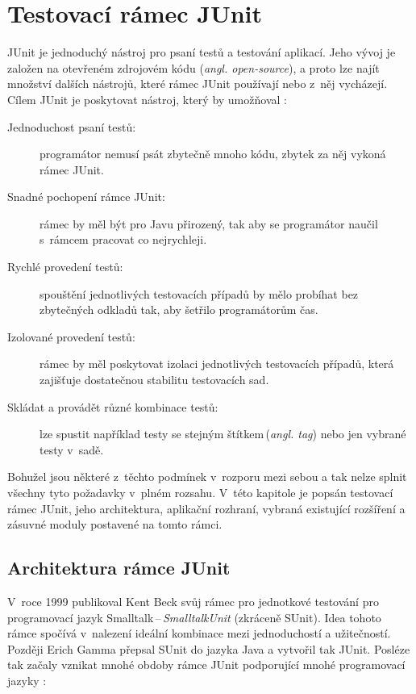 \chapter{Testovací rámec JUnit}                                           %
JUnit je jednoduchý nástroj pro psaní testů a testování aplikací. Jeho vývoj je založen na otevřeném zdrojovém kódu (\emph{angl. open-source}), a proto lze najít množství dalších nástrojů, které rámec JUnit používají nebo z~něj vycházejí. Cílem JUnit je poskytovat nástroj, který by umožňoval \cite{JUnitGuide}:
\begin{description}
  \item[Jednoduchost psaní testů:]
  programátor nemusí psát zbytečně mnoho kódu, zbytek za něj vykoná rámec JUnit.
  \item[Snadné pochopení rámce JUnit:]
  rámec by měl být pro Javu přirozený, tak aby se programátor naučil s~rámcem pracovat co nejrychleji.
  \item[Rychlé provedení testů:]
  spouštění jednotlivých testovacích případů by mělo probíhat bez zbytečných odkladů tak, aby šetřilo programátorům čas.
  \item[Izolované provedení testů:]
  rámec by měl poskytovat izolaci jednotlivých testovacích případů, která zajišťuje dostatečnou stabilitu testovacích sad.
  \item[Skládat a provádět různé kombinace testů:]
  lze spustit například testy se stejným štítkem\,(\emph{angl. tag}) nebo jen vybrané testy v~sadě.
\end{description}

Bohužel jsou některé z~těchto podmínek v~rozporu mezi sebou a tak nelze splnit všechny tyto požadavky v~plném rozsahu. V~této kapitole je popsán testovací rámec JUnit, jeho architektura, aplikační rozhraní, vybraná existující rozšíření a zásuvné moduly postavené na tomto rámci. 


  \section{Architektura rámce JUnit}
  V~roce 1999 publikoval Kent Beck svůj rámec pro jednotkové testování pro programovací jazyk Smalltalk\,--\,\emph{SmalltalkUnit} (zkráceně SUnit). Idea tohoto rámce spočívá v~nalezení ideální kombinace mezi jednoduchostí a užitečností. Později Erich Gamma přepsal SUnit do jazyka Java a vytvořil tak JUnit. Posléze tak začaly vznikat mnohé obdoby rámce JUnit podporující mnohé programovací jazyky \cite{UnitTestFrameworks}:

